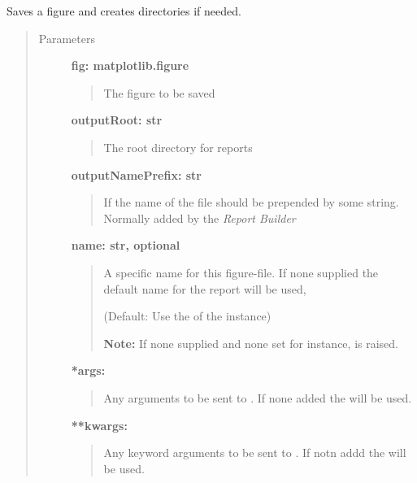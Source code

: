 \documentclass[letterpaper,10pt,english]{sphinxmanual}
\begin{document}
\begin{fulllineitems}
\begin{fulllineitems}
\end{fulllineitems}


\begin{fulllineitems}
\label{fseq.reporting:fseq.reporting.reports.ReportBase.saveFig}
Saves a figure and creates directories if needed.
\begin{quote}\begin{description}
\item[{Parameters}] \leavevmode
\textbf{fig: matplotlib.figure}
\begin{quote}

The figure to be saved
\end{quote}

\textbf{outputRoot: str}
\begin{quote}

The root directory for reports
\end{quote}

\textbf{outputNamePrefix: str}
\begin{quote}

If the name of the file should be prepended by some string.
Normally added by the \emph{Report Builder}
\end{quote}

\textbf{name: str, optional}
\begin{quote}

A specific name for this figure-file.
If none supplied the default name for the report will be used,

(Default: Use the  of the instance)

\textbf{Note:} If none supplied and none set for instance,
 is raised.
\end{quote}

\textbf{*args:}
\begin{quote}

Any arguments to be sent to .
If none added the  will be used.
\end{quote}

\textbf{**kwargs:}
\begin{quote}

Any keyword arguments to be sent to .
If notn addd the  will be used.
\end{quote}


\end{description}
\end{quote}
\end{fulllineitems}
\end{fulllineitems}
\end{document}
